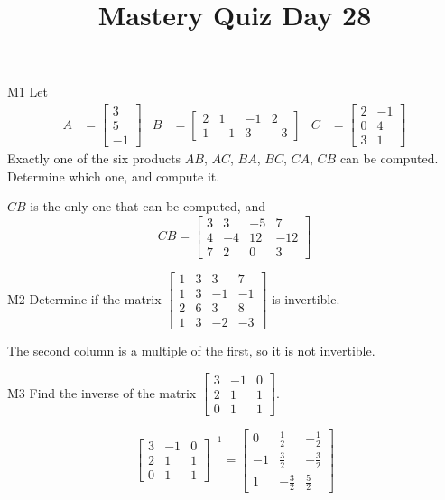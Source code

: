\documentclass{sbgLAquiz}
\title{Mastery Quiz Day 28 }
\begin{document}
\begin{problem}{M1}
Let 
\begin{align*}
A &= \begin{bmatrix} 3 \\ 5 \\ -1  \end{bmatrix} & B&=\begin{bmatrix}  2 & 1 & -1 & 2 \\ 1 & -1 & 3 & -3  \end{bmatrix} & C &= \begin{bmatrix} 2 & -1 \\ 0 & 4 \\ 3 & 1 \end{bmatrix} \end{align*}
Exactly one of the six products $AB$, $AC$, $BA$, $BC$, $CA$, $CB$ can be computed.  Determine which one, and compute it.
\end{problem}
\begin{solution}
$CB$ is the only one that can be computed, and
$$CB=\begin{bmatrix} 3 & 3 & -5 & 7 \\ 4 & -4 & 12 & -12 \\ 7 & 2 & 0 & 3 \end{bmatrix}$$
\end{solution}
\begin{problem}{M2}
Determine if the matrix $\begin{bmatrix} 1 & 3 & 3 & 7 \\ 1 & 3 & -1 & -1 \\ 2 & 6 & 3 & 8 \\ 1 & 3 & -2 & -3 \end{bmatrix}$ is invertible.
\end{problem}
\begin{solution}
The second column is a multiple of the first, so it is not invertible.
\end{solution}



\begin{extract}\newpage\end{extract}
\begin{problem}{M3}
Find the inverse of the matrix $\begin{bmatrix} 3 & -1 & 0  \\ 2 & 1 & 1  \\ 0 & 1 & 1   \end{bmatrix}$.
\end{problem}
\begin{solution}
$$\begin{bmatrix} 3 & -1 & 0  \\ 2 & 1 & 1  \\ 0 & 1 & 1   \end{bmatrix}^{-1} = \begin{bmatrix} 0 & \frac{1}{2} & -\frac{1}{2} \\ -1 & \frac{3}{2} & -\frac{3}{2} \\ 1 & -\frac{3}{2} & \frac{5}{2}\end{bmatrix}$$
\end{solution}
\end{document}
